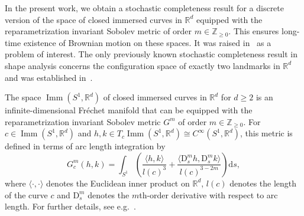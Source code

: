 \documentclass[11pt]{article}
\newcommand{\R}{\mathbb{R}}
\newcommand{\Z}{\mathbb{Z}}
\newcommand{\db}{{\mathrm d}}
\newcommand{\Db}{{\mathrm D}}
\begin{document}
In the present work, we obtain a stochastic completeness result for a discrete version of the space of closed immersed curves in $\R^d$ equipped with the reparametrization invariant Sobolev metric of order $m\in\Z_{\geq 0}$. This ensures long-time existence of Brownian motion on these spaces. It was raised in~\cite{cerqueira2024sobolevmetricsspacesdiscrete} as a problem of interest. The only previously known stochastic completeness result in shape analysis concerns the configuration space of exactly two landmarks in $\R^d$ and was established in~\cite{habermann2024long}.

\medskip

The space $\operatorname{Imm}(S^1,\R^d)$ of closed immersed curves in $\R^d$ for $d\geq 2$ is an infinite-dimensional Fr\'{e}chet manifold that can be equipped with the reparametrization invariant Sobolev metric $G^m$ of order $m\in\Z_{\geq 0}$. For $c\in \operatorname{Imm}(S^1,\R^d)$ and $h,k\in T_c\operatorname{Imm}(S^1,\R^d)\cong C^\infty(S^1,\R^d)$, this metric is defined in terms of arc length integration by
\begin{displaymath}
    G_c^m(h,k)= \int_{S^1} \left(\frac{\langle h,k \rangle}{l(c)^3}+\frac{\langle \Db_s^m h,\Db_s^m k\rangle}{l(c)^{3-2m}} \right)\db s,
\end{displaymath}
where $\langle\cdot,\cdot\rangle$ denotes the Euclidean inner product on $\R^d$, $l(c)$ denotes the length of the curve $c$ and $\Db_s^m$ denotes the $m$th-order derivative with respect to arc length. For further details, see e.g.~\cite{bruveris2015completeness,bruveris2014geodesic,cerqueira2024sobolevmetricsspacesdiscrete,michor2007overview}.
\end{document}
